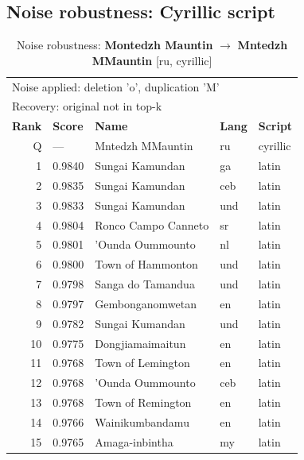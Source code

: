 \subsection*{Noise robustness: Cyrillic script}

\begin{table}[htbp]
\centering
\small
\caption{Noise robustness: \textbf{Montedzh Mauntin} $\rightarrow$ \textbf{Mntedzh MMauntin} [ru, cyrillic]}
\label{tab:noise-11}
\begin{tabular}{rllll}
\toprule
\multicolumn{5}{l}{\small Noise applied: deletion 'o', duplication 'M'} \\
\multicolumn{5}{l}{\small Recovery: original not in top-k} \\
\midrule
\textbf{Rank} & \textbf{Score} & \textbf{Name} & \textbf{Lang} & \textbf{Script} \\
\midrule
\rowcolor{gray!20} Q & --- & Mntedzh MMauntin & ru & cyrillic \\
\midrule
1 & 0.9840 & Sungai Kamundan & ga & latin \\
2 & 0.9835 & Sungai Kamundan & ceb & latin \\
3 & 0.9833 & Sungai Kamundan & und & latin \\
4 & 0.9804 & Ronco Campo Canneto & sr & latin \\
5 & 0.9801 & 'Ounda Oummounto & nl & latin \\
6 & 0.9800 & Town of Hammonton & und & latin \\
7 & 0.9798 & Sanga do Tamandua & und & latin \\
8 & 0.9797 & Gembonganomwetan & en & latin \\
9 & 0.9782 & Sungai Kumandan & und & latin \\
10 & 0.9775 & Dongjiamaimaitun & en & latin \\
11 & 0.9768 & Town of Lemington & en & latin \\
12 & 0.9768 & 'Ounda Oummounto & ceb & latin \\
13 & 0.9768 & Town of Remington & en & latin \\
14 & 0.9766 & Wainikumbandamu & en & latin \\
15 & 0.9765 & Amaga-inbintha & my & latin \\
\bottomrule
\end{tabular}
\end{table}

